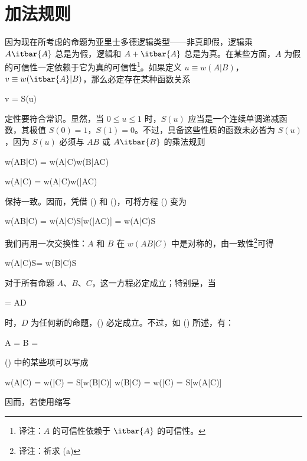 \section{加法规则}

因为现在所考虑的命题为亚里士多德逻辑类型——非真即假，逻辑乘 $A\itbar{A}$ 总是为假，逻辑和 $A + \itbar{A}$ 总是为真。在某些方面，$A$ 为假的可信性一定依赖于它为真的可信性\footnote{译注：$A$ 的可信性依赖于 $\itbar{A}$ 的可信性。}。如果定义 $u\equiv w(A|B)$，$v\equiv w(\itbar{A}|B)$，那么必定存在某种函数关系

\placeformula[2-36]
\startformula
v = S(u)
\stopformula

定性要符合常识。显然，当 $0\le u\le 1$ 时，$S(u)$ 应当是一个连续单调递减函数，其极值 $S(0) = 1$，$S(1) = 0$。不过，具备这些性质的函数未必皆为 $S(u)$，因为 $S(u)$ 必须与 $AB$ 或 $A\itbar{B}$ 的乘法规则

\placeformula[2-37]
\startformula
w(AB|C) = w(A|C)w(B|AC)
\stopformula

\placeformula[2-38]
\startformula
w(A|C) =  w(A|C)w(|AC)
\stopalign
\stopformula

保持一致。因而，凭借 (\in[2-36]) 和 (\in[2-38])，可将方程 (\in[2-37]) 变为

\placeformula[2-39]
\startformula
w(AB|C) = w(A|C)S[w(|AC)] = w(A|C)S
\stopformula

我们再用一次交换性：$A$ 和 $B$ 在 $w(AB|C)$ 中是对称的，由一致性\footnote{译注：祈求 (a)}可得

\placeformula[2-40]
\startformula
w(A|C)S = w(B|C)S
\stopformula

对于所有命题 $A$、$B$、$C$，这一方程必定成立；特别是，当

\placeformula[2-41]
\startformula
{} = AD
\stopformula

时，$D$ 为任何新的命题，(\in[2-40]) 必定成立。不过，如 (\in[1-13]) 所述，有：

\placeformula[2-42]
\startformula
A = \quad\quad B = 
\stopformula

(\in[2-40]) 中的某些项可以写成

\placeformula[2-43]
\startformula
\startmathalignment[n=3]
\NC w(A|C) \NC = w(|C) \NC = S[w(B|C)] \NR
\NC w(B|C) \NC = w(|C) \NC = S[w(A|C)] \NR
\stopmathalignment
\stopformula

因而，若使用缩写

